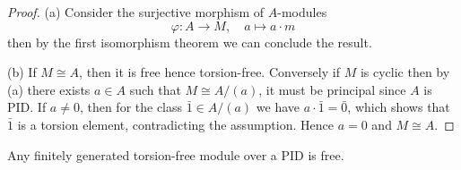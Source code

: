 \begin{proof}
    (a) Consider the surjective morphism of \(A\)-modules
    \[\varphi: A \to M, \quad a \mapsto a \cdot m\]
    then by the first isomorphism theorem we can conclude the result.

    (b) If \(M \cong A\), then it is free hence torsion-free. Conversely if \(M\) is cyclic then by (a) there exists \(a \in A\) such that \(M \cong A/(a)\), it must be principal since \(A\) is PID. If \(a \neq 0\), then for the class \(\bar{1} \in A/(a)\) we have \(a \cdot \bar{1} = \bar{0}\), which shows that \(\bar{1}\) is a torsion element, contradicting the assumption. Hence \(a = 0\) and \(M \cong A\).
\end{proof}

\begin{theorem}
    Any finitely generated torsion-free module over a PID is free.
\end{theorem}
